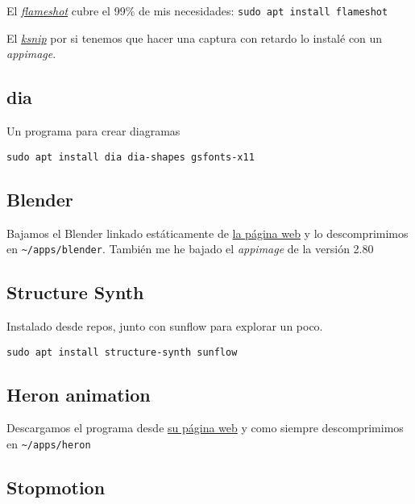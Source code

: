 \documentclass[
  12pt,
  spanish,
]{article}
\begin{document}
El \href{https://flameshot.js.org/\#/}{\emph{flameshot}} cubre el 99\%
de mis necesidades: \texttt{sudo\ apt\ install\ flameshot}

El \href{https://github.com/DamirPorobic/ksnip}{\emph{ksnip}} por si
tenemos que hacer una captura con retardo lo instalé con un
\emph{appimage}.

\hypertarget{dia}{%
\subsection{dia}\label{dia}}

Un programa para crear diagramas

\begin{verbatim}
sudo apt install dia dia-shapes gsfonts-x11
\end{verbatim}

\hypertarget{blender}{%
\subsection{Blender}\label{blender}}

Bajamos el Blender linkado estáticamente de
\href{https://www.blender.org}{la página web} y lo descomprimimos en
\texttt{\textasciitilde{}/apps/blender}. También me he bajado el
\emph{appimage} de la versión 2.80

\hypertarget{structure-synth}{%
\subsection{Structure Synth}\label{structure-synth}}

Instalado desde repos, junto con sunflow para explorar un poco.

\begin{verbatim}
sudo apt install structure-synth sunflow
\end{verbatim}

\hypertarget{heron-animation}{%
\subsection{Heron animation}\label{heron-animation}}

Descargamos el programa desde
\href{https://heronanimation.brunolefevre.net/}{su página web} y como
siempre descomprimimos en \texttt{\textasciitilde{}/apps/heron}

\hypertarget{stopmotion}{%
\subsection{Stopmotion}\label{stopmotion}}
\end{document}

